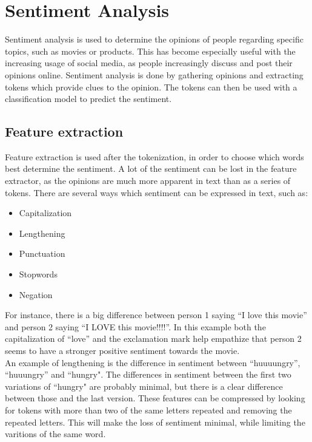 \section{Sentiment Analysis}\label{SentiAnal}
Sentiment analysis is used to determine the opinions of people regarding
specific topics, such as movies or products. This has become especially useful
with the increasing usage of social media, as people increasingly discuss and
post their opinions online. Sentiment analysis is done by
gathering opinions and extracting tokens which provide clues to the opinion. The tokens can then be
used with a classification model to predict the sentiment. 

\subsection{Feature extraction} 
Feature extraction is used after the tokenization, in order to choose which
words best determine the sentiment. A lot of the sentiment can be lost in the
feature extractor, as the opinions are much more apparent in text than as a
series of tokens. There are several ways which sentiment can be expressed in
text, such as\citep[Overview.3-4]{Sentiment}:

\begin{itemize}
  \item Capitalization 
  \item Lengthening
  \item Punctuation
  \item Stopwords
  \item Negation
\end{itemize}

For instance, there is a big difference between person 1 saying ``I love this
movie'' and person 2 saying ``I LOVE this movie!!!!''. In this example both the
capitalization of ``love'' and the exclamation mark help empathize that person
2 seems to have a stronger positive sentiment towards the movie.\\


An example of lengthening is the difference in sentiment between ``huuuungry'',
``huuungry'' and ``hungry". The differences in sentiment between the first two
variations of ``hungry" are probably minimal, but there is a clear difference
between those and the last version. These features can be compressed by looking
for tokens with more than two of the same letters repeated and removing the
repeated letters. This will make the loss of sentiment minimal, while limiting
the varitions of the same word.\nl

